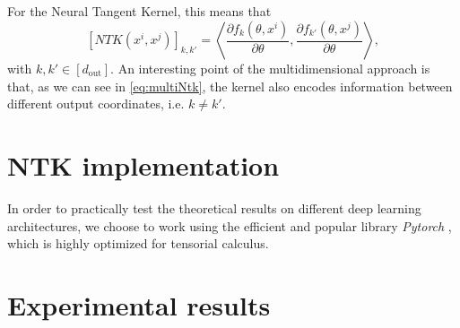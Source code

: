 \documentclass[11pt,notitlepage]{article}
\numberwithin{equation}{section}
\theoremstyle{remark}
\theoremstyle{definition}
\begin{document}
	For the Neural Tangent Kernel, this means that 
	\begin{equation}\label{eq:multiNtk}
	[NTK(x^i,x^j)]_{k, k'} = \left\langle \frac{\partial f_k (\theta, x^i)}{\partial \theta}, \frac{\partial f_{k'} (\theta, x^j)}{\partial \theta} \right\rangle,
	\end{equation}
	with $k,k' \in [d_\text{out}]$.
	An interesting point of the multidimensional approach is that, as we can see in \eqref{eq:multiNtk}, the kernel also encodes information between different output coordinates, i.e. $k \neq k'$.
	
	
	\section{NTK implementation}\label{sec:implementation}
	
	In order to practically test the theoretical results on different deep learning architectures, we choose to work using the efficient and popular library \emph{Pytorch} \cite{pytorch}, which is highly optimized for tensorial calculus.
	
	
	\section{Experimental results}\label{sec:experiments}
	
	
\end{document}
